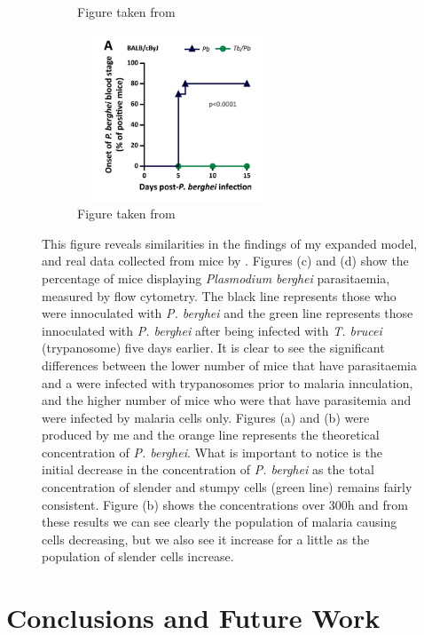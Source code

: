 \documentclass[11pt]{article}
\begin{document}
\begin{figure}[!htb]
\begin{center}
\begin{subfigure}{8cm}
				\caption{Figure taken from \citep{sanches2019trypanosoma}}
			\end{subfigure}
			\begin{subfigure}{8cm}
				\centering\includegraphics[width=6cm, height=5cm]{plot8.png}
				\caption{Figure taken from \citep{sanches2019trypanosoma}}
			\end{subfigure}
		\caption{This figure reveals similarities in the findings of my expanded model, and real data collected from mice by \citet{sanches2019trypanosoma}. Figures (c) and (d) show the percentage of mice displaying \textit{Plasmodium berghei} parasitaemia, measured by flow cytometry. The black line represents those who were innoculated with \textit{P. berghei} and the green line represents those innoculated with \textit{P. berghei} after being infected with \textit{T. brucei} (trypanosome) five days earlier. It is clear to see the significant differences between the lower number of mice that have parasitaemia and a were infected with trypanosomes prior to malaria innculation, and the higher number of mice who were that have parasitemia and were infected by malaria cells only. Figures (a) and (b) were produced by me and the orange line represents the theoretical concentration of \textit{P. berghei}. What is important to notice is the initial decrease in the concentration of \textit{P. berghei} as the total concentration of slender and stumpy cells (green line) remains fairly consistent. Figure (b) shows the concentrations over 300h and from these results we can see clearly the population of malaria causing cells decreasing, but we also see it increase for a little as the population of slender cells increase.}
		\end{center}
	\end{figure}

	\section{Conclusions and Future Work}
	
\end{document}
